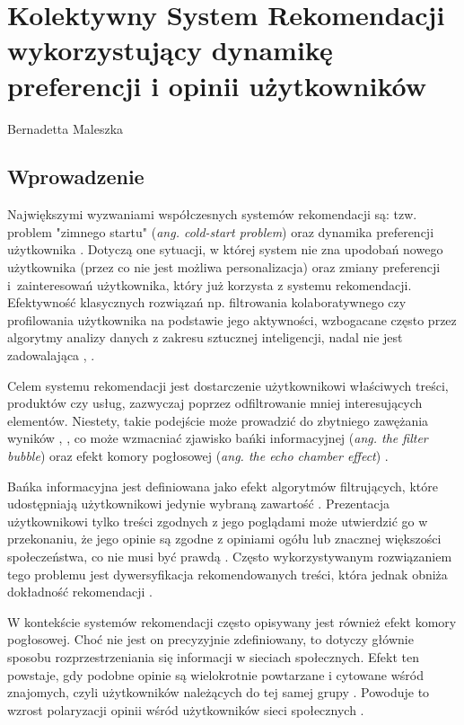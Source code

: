 \chapter[Kolektywny System \ldots]{Kolektywny System Rekomendacji wykorzystujący dynamikę preferencji i opinii użytkowników}
\thispagestyle{empty}
\vspace{-8mm} {\large Bernadetta Maleszka} \vspace{8mm}


\section{Wprowadzenie}

Największymi wyzwaniami współczesnych systemów rekomendacji są: tzw. problem "zimnego startu" (\textit{ang. cold-start problem}) oraz dynamika preferencji użytkownika \cite{maleszka}. Dotyczą one sytuacji, w której system nie zna upodobań nowego użytkownika (przez co nie jest możliwa personalizacja) oraz zmiany preferencji i~zainteresowań użytkownika, który już korzysta z systemu rekomendacji. Efektywność klasycznych rozwiązań np. filtrowania kolaboratywnego czy profilowania użytkownika na podstawie jego aktywności, wzbogacane często przez algorytmy analizy danych z zakresu sztucznej inteligencji, nadal nie jest zadowalająca \cite{montaner}, \cite{patel}.

Celem systemu rekomendacji jest dostarczenie użytkownikowi właściwych treści, produktów czy usług, zazwyczaj poprzez odfiltrowanie mniej interesujących elementów. Niestety, takie podejście może prowadzić do zbytniego zawężania wyników \cite{nguyen}, \cite{sukiennik}, co może wzmacniać zjawisko bańki informacyjnej (\textit{ang. the filter bubble}) \cite{areeb} oraz efekt komory pogłosowej (\textit{ang. the echo chamber effect}) \cite{terren}.

Bańka informacyjna jest definiowana jako efekt algorytmów filtrujących, które udostępniają użytkownikowi jedynie wybraną zawartość \cite{lunardi}. Prezentacja użytkownikowi tylko treści zgodnych z jego poglądami może utwierdzić go w przekonaniu, że jego opinie są zgodne z opiniami ogółu lub znacznej większości społeczeństwa, co nie musi być prawdą \cite{areeb}. Często wykorzystywanym rozwiązaniem tego problemu jest dywersyfikacja rekomendowanych treści, która jednak obniża dokładność rekomendacji \cite{lunardi1}.

W kontekście systemów rekomendacji często opisywany jest również efekt komory pogłosowej. Choć nie jest on precyzyjnie zdefiniowany, to dotyczy głównie sposobu rozprzestrzeniania się informacji w sieciach społecznych. Efekt ten powstaje, gdy podobne opinie są wielokrotnie powtarzane i cytowane wśród znajomych, czyli użytkowników należących do tej samej grupy  \cite{mahmoudi}. Powoduje to wzrost polaryzacji opinii wśród użytkowników sieci społecznych \cite{interian}.


